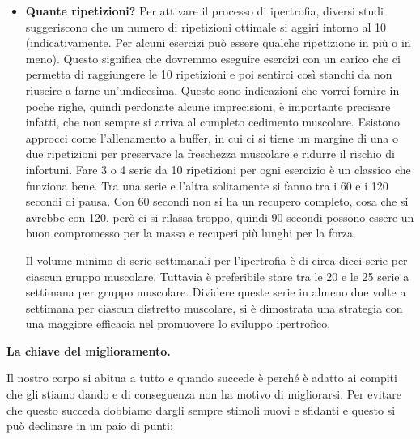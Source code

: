 \documentclass[12pt]{book} %
\begin{document}
\begin{itemize}
\item \textbf{Quante ripetizioni?}
Per attivare il processo di ipertrofia, diversi studi suggeriscono che un numero di ripetizioni ottimale si aggiri intorno al 10 (indicativamente. Per alcuni esercizi può essere qualche ripetizione in più o in meno). Questo significa che dovremmo eseguire esercizi con un carico che ci permetta di raggiungere le 10 ripetizioni e poi sentirci così stanchi da non riuscire a farne un'undicesima.
Queste sono indicazioni che vorrei fornire in poche righe, quindi perdonate alcune imprecisioni, è importante precisare infatti, che non sempre si arriva al completo cedimento muscolare. Esistono approcci come l'allenamento a buffer, in cui ci si tiene un margine di una o due ripetizioni per preservare la freschezza muscolare e ridurre il rischio di infortuni.
Fare 3 o 4 serie da 10 ripetizioni per ogni esercizio è un classico che funziona bene. Tra una serie e l'altra solitamente si fanno tra i 60 e i 120 secondi di pausa. Con 60 secondi non si ha un recupero completo, cosa che si avrebbe con 120, però ci si rilassa troppo, quindi 90 secondi possono essere un buon compromesso per la massa e recuperi più lunghi per la forza.

Il volume minimo di serie settimanali per l'ipertrofia è di circa dieci serie per ciascun gruppo muscolare. Tuttavia è preferibile stare tra le 20 e le 25 serie a settimana per gruppo muscolare. Dividere queste serie in almeno due volte a settimana per ciascun distretto muscolare, si è dimostrata una strategia con una maggiore efficacia nel promuovere lo sviluppo ipertrofico.
\end{itemize}

\textbf{La chiave del miglioramento.}

Il nostro corpo si abitua a tutto e quando succede è perché è adatto ai compiti che gli stiamo dando e di conseguenza non ha motivo di migliorarsi.
Per evitare che questo succeda dobbiamo dargli sempre stimoli nuovi e sfidanti e questo si può declinare in un paio di punti:
\end{document}
